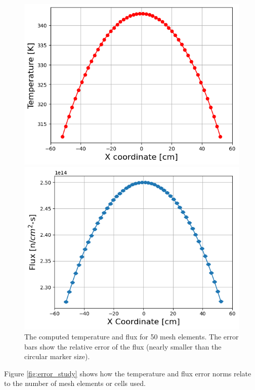 \documentclass[letterpaper]{mc2023}
\begin{document}
\begin{figure}[H]
    \centering
    \begin{minipage}[b]{0.45\linewidth}
        \includegraphics[width=\linewidth]{figures/temp_50.png}
    \end{minipage}
    \begin{minipage}[b]{0.45\linewidth}
        \includegraphics[width=\linewidth]{figures/flux_50.png}
    \end{minipage}
    \caption{The computed temperature and flux for 50 mesh elements. The error bars show the relative error of the flux
    (nearly smaller than the circular marker size).}\label{fig:temp_flux_50}
\end{figure}
Figure \ref{fig:error_study} shows how the temperature and flux error norms relate to the number of mesh elements or cells used.
\end{document}
